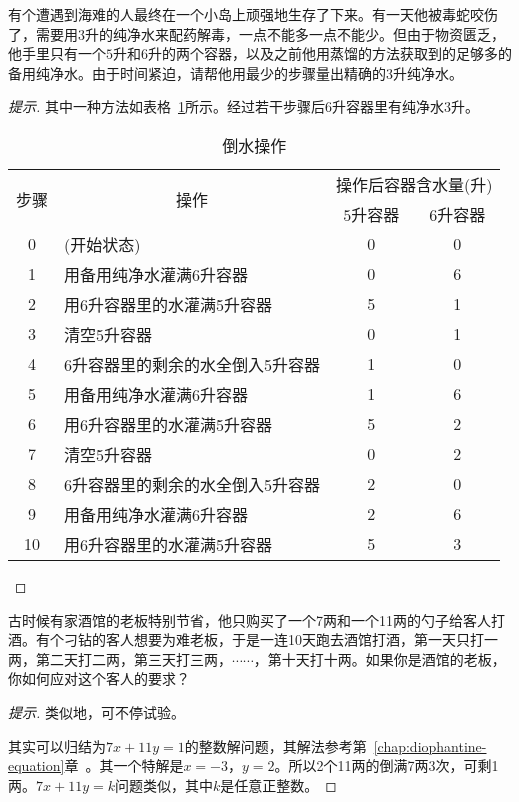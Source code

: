 \begin{example}
  有个遭遇到海难的人最终在一个小岛上顽强地生存了下来。有一天他被毒蛇咬伤了，需要用$3$升的纯净水来配药解毒，一点不能多一点不能少。但由于物资匮乏，他手里只有一个$5$升和$6$升的两个容器，以及之前他用蒸馏的方法获取到的足够多的备用纯净水。由于时间紧迫，请帮他用最少的步骤量出精确的$3$升纯净水。
\end{example}
\begin{proof}[提示]
  其中一种方法如表格~\ref{tab:water-ops}所示。经过若干步骤后6升容器里有纯净水3升。
  \begin{table}[htbp]
    \centering
    \caption{倒水操作}
    \label{tab:water-ops}
    \renewcommand*{\arraystretch}{1.0}
    \begin{tabular}{clcc}
      \toprule[1.5pt]
      \multirow{2}{*}{步骤} & \multicolumn{1}{c}{\multirow{2}{*}{操作}} & \multicolumn{2}{c}{操作后容器含水量(升)} \\
      \cline{3-4}
           &      & $5$升容器 & $6$升容器 \\
      \midrule[1pt]
      0 & (开始状态)                       & 0 & 0\\
      \midrule[1pt]
      1 & 用备用纯净水灌满6升容器          & 0 & 6\\
      2 & 用6升容器里的水灌满5升容器       & 5 & 1\\
      3 & 清空5升容器                      & 0 & 1\\
      4 & 6升容器里的剩余的水全倒入5升容器 & 1 & 0\\
      5 & 用备用纯净水灌满6升容器          & 1 & 6\\
      6 & 用6升容器里的水灌满5升容器       & 5 & 2\\
      7 & 清空5升容器                      & 0 & 2\\
      8 & 6升容器里的剩余的水全倒入5升容器 & 2 & 0\\
      9 & 用备用纯净水灌满6升容器          & 2 & 6\\
     10 & 用6升容器里的水灌满5升容器       & 5 & 3\\
      \bottomrule[1.5pt]
    \end{tabular}
  \end{table}
\end{proof}

\begin{question}
  古时候有家酒馆的老板特别节省，他只购买了一个7两和一个11两的勺子给客人打酒。有个刁钻的客人想要为难老板，于是一连10天跑去酒馆打酒，第一天只打一两，第二天打二两，第三天打三两，$\cdots\cdots$，第十天打十两。如果你是酒馆的老板，你如何应对这个客人的要求？
\end{question}
\begin{proof}[提示]
  类似地，可不停试验。

  其实可以归结为$7x+11y=1$的整数解问题，其解法参考第~\ref{chap:diophantine-equation}章~。其一个特解是$x=-3$，$y=2$。所以2个11两的倒满7两3次，可剩1两。$7x+11y=k$问题类似，其中$k$是任意正整数。
\end{proof}


